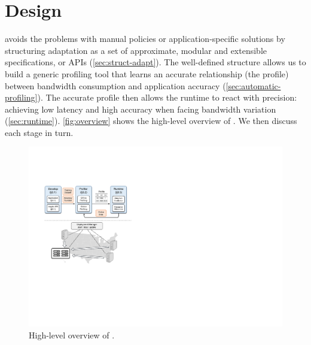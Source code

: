 \section{\sysname{} Design}
\label{sec:system}

\sysname{} avoids the problems with manual policies or application-specific
solutions by structuring adaptation as a set of approximate, modular and
extensible specifications, or APIs (\autoref{sec:struct-adapt}). The
well-defined structure allows us to build a generic profiling tool that learns
an accurate relationship (the profile) between bandwidth consumption and
application accuracy (\autoref{sec:automatic-profiling}). The accurate profile
then allows the runtime to react with precision: achieving low latency and high
accuracy when facing bandwidth variation
(\autoref{sec:runtime}). \autoref{fig:overview} shows the high-level overview of
\sysname{}. We then discuss each stage in turn.

\begin{figure}
  \centering
  \includegraphics[width=.9\linewidth]{figures/system.pdf}
  \caption{High-level overview of \sysname{}.}
  \label{fig:overview}
\end{figure}





\newpage
\clearpage


